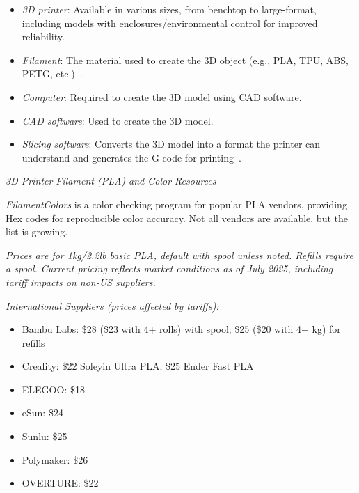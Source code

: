 \begin{itemize}
    \item \emph{3D printer}: Available in various sizes, from benchtop to large-format, including models with enclosures/environmental control for improved reliability.
    \item \emph{Filament}: The material used to create the 3D object (e.g., PLA, TPU, ABS, PETG, etc.)~\cite{TechLearning2023}.
    \item \emph{Computer}: Required to create the 3D model using CAD software.
    \item \emph{CAD software}: Used to create the 3D model.
    \item \emph{Slicing software}: Converts the 3D model into a format the printer can understand and generates the G-code for printing~\cite{TeachThought2021}.
\end{itemize}

\emph{3D Printer Filament (PLA) and Color Resources}

\emph{FilamentColors} is a color checking program for popular PLA vendors, providing Hex codes for reproducible color accuracy. Not all vendors are available, but the list is growing.

\textit{Prices are for 1kg/2.2lb basic PLA, default with spool unless noted. Refills require a spool. Current pricing reflects market conditions as of July 2025, including tariff impacts on non-US suppliers.}

\emph{International Suppliers (prices affected by tariffs):}
\begin{itemize}
    \item Bambu Labs: \$28 (\$23 with 4+ rolls) with spool; \$25 (\$20 with 4+ kg) for refills
    \item Creality: \$22 Soleyin Ultra PLA; \$25 Ender Fast PLA
    \item ELEGOO: \$18
    \item eSun: \$24
    \item Sunlu: \$25
    \item Polymaker: \$26
    \item OVERTURE: \$22
\end{itemize}

